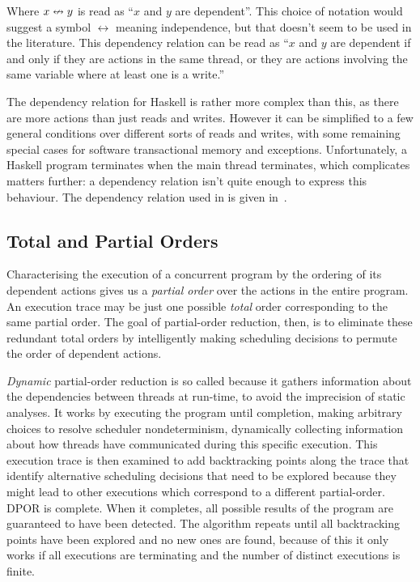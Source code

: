 Where $x \nleftrightarrow y$ is read as ``$x$ and $y$ are dependent''.  This choice of
notation would suggest a symbol $\leftrightarrow$ meaning independence, but that
doesn't seem to be used in the literature.  This dependency relation can be read
as ``$x$ and $y$ are dependent if and only if they are actions in the same
thread, or they are actions involving the same variable where at least one is a
write.''

The dependency relation for Haskell is rather more complex than this, as there
are more actions than just reads and writes.  However it can be simplified to a
few general conditions over different sorts of reads and writes, with some
remaining special cases for software transactional memory and exceptions.
Unfortunately, a Haskell program terminates when the main thread terminates,
which complicates matters further: a dependency relation isn't quite enough to
express this behaviour.  The dependency relation used in \dejafu{} is given
in~.

\subsection{Total and Partial Orders}

Characterising the execution of a concurrent program by the ordering of its
dependent actions gives us a \emph{partial order} over the actions in the entire
program.  An execution trace may be just one possible \emph{total} order
corresponding to the same partial order.  The goal of partial-order reduction,
then, is to eliminate these redundant total orders by intelligently making
scheduling decisions to permute the order of dependent actions.

\emph{Dynamic} partial-order reduction is so called because it gathers
information about the dependencies between threads at run-time, to avoid the
imprecision of static analyses\cite{flanagan2005}.  It works by executing the
program until completion, making arbitrary choices to resolve scheduler
nondeterminism, dynamically collecting information about how threads have
communicated during this specific execution.  This execution trace is then
examined to add backtracking points along the trace that identify alternative
scheduling decisions that need to be explored because they might lead to other
executions which correspond to a different partial-order.  DPOR is complete.
When it completes, all possible results of the program are guaranteed to have
been detected.  The algorithm repeats until all backtracking points have been
explored and no new ones are found, because of this it only works if all
executions are terminating and the number of distinct executions is finite.

